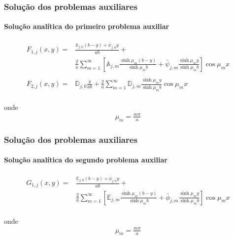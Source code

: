 \documentclass{beamer}
\begin{document}
\begin{frame}
	\frametitle{Solução dos problemas auxiliares}
	\framesubtitle{Solução analítica do primeiro problema auxiliar}
	
	\begin{alertblock}{}
		\begin{align*}
		F_{1, j}(x, y) = & \frac{\mathbb{A}_{j,0}(b - y) + \bar{\psi}_{j,0}y}{ab} + \nonumber \\
		&\frac{2}{a}\sum_{m=1}^\infty\left[\mathbb{A}_{j,m}\frac{\sinh\mu_m (b - y)}{\sinh\mu_m b} + \bar{\psi}_{j, m}\frac{\sinh\mu_m y}{\sinh\mu_m b}\right]\cos\mu_m x \\ \\
		F_{2, j}(x, y) = & \mathbb{D}_{j,0}\frac{y}{ab}  + \frac{2}{a}\sum_{m=1}^\infty\mathbb{D}_{j,m}\frac{\sinh\mu_m y}{\sinh\mu_m b} \cos\mu_m x \\
		\end{align*}
	\end{alertblock}	
	
	onde
	\begin{align*}
	\mu_m = \frac{m \pi}{a}
	\end{align*}
	
\end{frame}

\begin{frame}
	\frametitle{Solução dos problemas auxiliares}
	\framesubtitle{Solução analítica do segundo problema auxiliar}
	
	\begin{alertblock}{}
	\begin{align*}	
		G_{1, j}(x, y) = & \frac{\mathbb{E}_{j,0}(b - y) + \bar{\phi}_{j,0}y}{ab} + \nonumber \\
		&\frac{2}{a}\sum_{m=1}^\infty\left[\mathbb{E}_{j,m}\frac{\sinh\mu_m (b - y)}{\sinh\mu_m b} + \bar{\phi}_{j, m}\frac{\sinh\mu_m y}{\sinh\mu_m b}\right]\cos\mu_m x \\
		\end{align*}
	\end{alertblock}	
	
	onde
	\begin{align*}
	\mu_m = \frac{m \pi}{a}
	\end{align*}
	
\end{frame}
\end{document}
